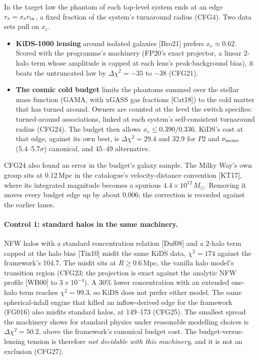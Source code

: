\documentclass[10pt]{article}
\begin{document}
In the target law the phantom of each top-level system ends at an edge $r_e=x_er_{\rm ta}$, a fixed fraction of the system's turnaround radius (CFG4). Two data sets pull on $x_e$.
\begin{itemize}
\item \textbf{KiDS-1000 lensing} around isolated galaxies [Bro21] prefers $x_e\approx0.62$. Scored with the programme's machinery (FP20's exact projector, a linear 2-halo term whose amplitude is capped at each lens's peak-background bias), it beats the untruncated law by $\Delta\chi^2=-35$ to $-38$ (CFG21).
\item \textbf{The cosmic cold budget} limits the phantoms summed over the stellar mass function (GAMA, with xGASS gas fractions [Cat18]) to the cold matter that has turned around. Owners are counted at the level the switch specifies: turned-around associations, linked at each system's self-consistent turnaround radius (CFG24). The budget then allows $x_e\leq0.390/0.336$. KiDS's cost at that edge, against its own best, is $\Delta\chi^2=29.4$ and 32.9 for $P2$ and $\nu_{\rm mono}$ (5.4--5.7$\sigma$) canonical, and 45--49 alternative.
\end{itemize}
CFG24 also found an error in the budget's galaxy sample. The Milky Way's own group sits at 0.12\,Mpc in the catalogue's velocity-distance convention [KT17], where its integrated magnitude becomes a spurious $4.4\times10^{12}\,M_\odot$. Removing it moves every budget edge up by about 0.006; the correction is recorded against the earlier lanes.

\paragraph{Control 1: standard halos in the same machinery.} NFW halos with a standard concentration relation [Duf08] and a 2-halo term capped at the halo bias [Tin10] misfit the same KiDS data, $\chi^2=174$ against the framework's 104.7. The misfit sits at $R\geq0.6$\,Mpc, the vanilla halo model's transition region (CFG23; the projection is exact against the analytic NFW profile [WB00] to $3\times10^{-4}$). A 30\% lower concentration with an extended one-halo term reaches $\chi^2=99.3$, so KiDS does not prefer either model. The same spherical-infall engine that killed an inflow-derived edge for the framework (FG016) also misfits standard halos, at 149--173 (CFG25). The smallest spread the machinery shows for standard physics under reasonable modelling choices is $\Delta\chi^2=50.2$, above the framework's canonical budget cost. The budget-versus-lensing tension is therefore \emph{not decidable with this machinery}, and it is not an exclusion (CFG27).
\end{document}

